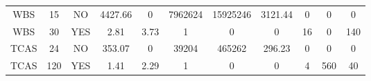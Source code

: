 \begin{table*}[]
\begin{tabular}{@{}ccccccccccc@{}}
        WBS                                                      & 15                                                        & NO                                                                 & 4427.66                                                         & 0                                                                        & 7962624                                                    & 15925246                                                      & 3121.44                                                       & 0                                                           & 0                                                                    & 0                                                                    \\
        WBS                                                      & 30                                                        & YES                                                                & 2.81                                                            & 3.73                                                                     & 1                                                          & 0                                                             & 0                                                             & 16                                                          & 0                                                                    & 140                                                                  \\ \midrule
        TCAS                                                     & 24                                                        & NO                                                                 & 353.07                                                          & 0                                                                        & 39204                                                      & 465262                                                        & 296.23                                                        & 0                                                           & 0                                                                    & 0                                                                    \\
        TCAS                                                     & 120                                                       & YES                                                                & 1.41                                                            & 2.29                                                                     & 1                                                          & 0                                                             & 0                                                             & 4                                                           & 560                                                                  & 40                                                                   \\ \midrule

\end{tabular}
\end{table*}
